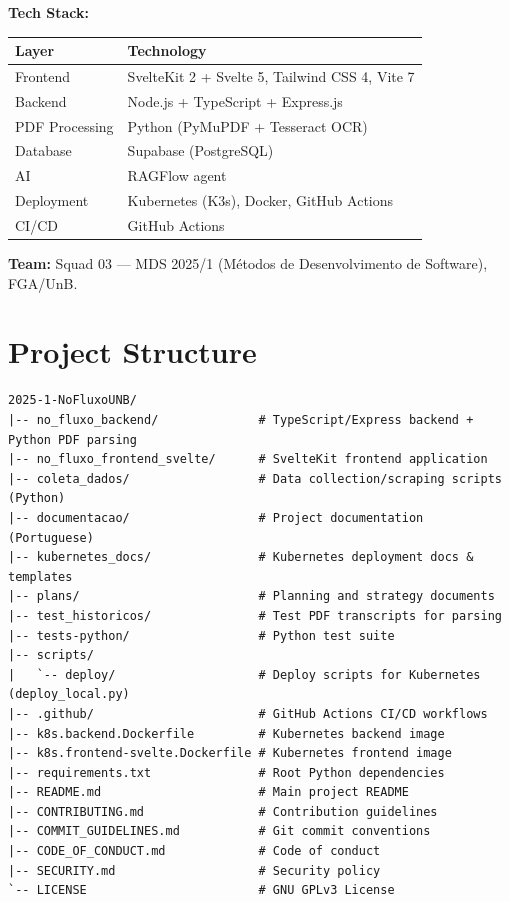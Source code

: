 \documentclass[11pt,a4paper]{article}
\begin{document}
\medskip
\noindent\textbf{Tech Stack:}

\begin{center}
\begin{tabular}{@{}ll@{}}
\toprule
\textbf{Layer} & \textbf{Technology} \\
\midrule
Frontend       & SvelteKit 2 + Svelte 5, Tailwind CSS 4, Vite 7 \\
Backend        & Node.js + TypeScript + Express.js \\
PDF Processing & Python (PyMuPDF + Tesseract OCR) \\
Database       & Supabase (PostgreSQL) \\
AI             & RAGFlow agent \\
Deployment     & Kubernetes (K3s), Docker, GitHub Actions \\
CI/CD          & GitHub Actions \\
\bottomrule
\end{tabular}
\end{center}

\medskip
\noindent\textbf{Team:} Squad 03 — MDS 2025/1 (Métodos de Desenvolvimento de
Software), FGA/UnB.

\section{Project Structure}

\begin{lstlisting}
2025-1-NoFluxoUNB/
|-- no_fluxo_backend/              # TypeScript/Express backend + Python PDF parsing
|-- no_fluxo_frontend_svelte/      # SvelteKit frontend application
|-- coleta_dados/                  # Data collection/scraping scripts (Python)
|-- documentacao/                  # Project documentation (Portuguese)
|-- kubernetes_docs/               # Kubernetes deployment docs & templates
|-- plans/                         # Planning and strategy documents
|-- test_historicos/               # Test PDF transcripts for parsing
|-- tests-python/                  # Python test suite
|-- scripts/
|   `-- deploy/                    # Deploy scripts for Kubernetes (deploy_local.py)
|-- .github/                       # GitHub Actions CI/CD workflows
|-- k8s.backend.Dockerfile         # Kubernetes backend image
|-- k8s.frontend-svelte.Dockerfile # Kubernetes frontend image
|-- requirements.txt               # Root Python dependencies
|-- README.md                      # Main project README
|-- CONTRIBUTING.md                # Contribution guidelines
|-- COMMIT_GUIDELINES.md           # Git commit conventions
|-- CODE_OF_CONDUCT.md             # Code of conduct
|-- SECURITY.md                    # Security policy
`-- LICENSE                        # GNU GPLv3 License
\end{lstlisting}
\end{document}
